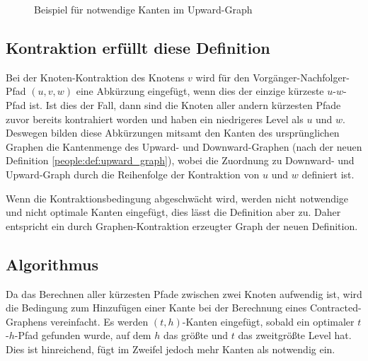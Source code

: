 \begin{figure}[h!]
  \centering
  \caption{Beispiel für notwendige Kanten im Upward-Graph}
  \label{fig:people:notwendige_kanten}
\end{figure}

\subsection{Kontraktion erfüllt diese Definition}

Bei der Knoten-Kontraktion des Knotens $v$ wird für den Vorgänger-Nachfolger-Pfad $(u, v, w)$ eine Abkürzung eingefügt, wenn dies der einzige kürzeste $u$-$w$-Pfad ist.
Ist dies der Fall, dann sind die Knoten aller andern kürzesten Pfade zuvor bereits kontrahiert worden und haben ein niedrigeres Level als $u$ und $w$.
Deswegen bilden diese Abkürzungen mitsamt den Kanten des ursprünglichen Graphen die Kantenmenge des Upward- und Downward-Graphen (nach der neuen Definition \ref{people:def:upward_graph}), wobei die Zuordnung zu Downward- und Upward-Graph durch die Reihenfolge der Kontraktion von $u$ und $w$ definiert ist.

Wenn die Kontraktionsbedingung abgeschwächt wird, werden nicht notwendige und nicht optimale Kanten eingefügt, dies lässt die Definition aber zu.
Daher entspricht ein durch Graphen-Kontraktion erzeugter Graph der neuen Definition.

\subsection{Algorithmus}

Da das Berechnen aller kürzesten Pfade zwischen zwei Knoten aufwendig ist, wird die Bedingung zum Hinzufügen einer Kante bei der Berechnung eines Contracted-Graphens vereinfacht.
Es werden $(t, h)$-Kanten eingefügt, sobald ein optimaler $t$-$h$-Pfad gefunden wurde, auf dem $h$ das größte und $t$ das zweitgrößte Level hat.
Dies ist hinreichend, fügt im Zweifel jedoch mehr Kanten als notwendig ein.

